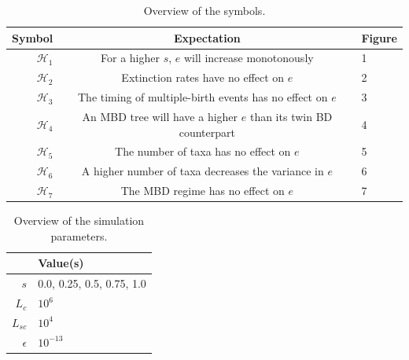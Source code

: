 \documentclass{article}
\begin{document}
\begin{table}
  \centering 
  \begin{tabular}{r c l}
    \hline
    Symbol                & Expectation & Figure \\
    \hline
    \hline
    $\mathcal{H}_1$       & For a higher $s$, $e$ will increase monotonously & 1 \\
    $\mathcal{H}_2$       & Extinction rates have no effect on $e$ & 2 \\
    $\mathcal{H}_3$       & The timing of multiple-birth events has no effect on $e$ & 3 \\
    $\mathcal{H}_4$       & An MBD tree will have a higher $e$ than its twin BD counterpart & 4 \\
    $\mathcal{H}_5$       & The number of taxa has no effect on $e$ & 5 \\
    $\mathcal{H}_6$       & A higher number of taxa decreases the variance in $e$ & 6 \\
    $\mathcal{H}_7$       & The MBD regime has no effect on $e$ & 7 \\
    \hline
  \end{tabular}
  \caption{
    Overview of the symbols. 
  }
  \label{table:hypotheses}
\end{table}



\begin{table}
  \centering 
  \begin{tabular}{r l}
    \hline
                          & Value(s) \\
    \hline
    \hline
    $s$                   & 0.0, 0.25, 0.5, 0.75, 1.0 \\
    $L_c$                 & $10^6$ \\
    $L_{sc}$              & $10^4$ \\
    $\epsilon$            & $10^{-13}$ \\
    \hline
  \end{tabular}
  \caption{
    Overview of the simulation parameters. 
  }
  \label{table:parameters}
\end{table}
\end{document}
